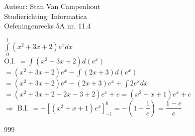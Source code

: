 \documentclass[a4paper]{article}
\begin{document}
  
\noindent \large Auteur: Stan Van Campenhout \\
\noindent \large Studierichting:  Informatica\\
\noindent \large Oefeningenreeks 5A nr. 11.4\\

\medskip

\normalsize

$ \displaystyle\int\limits_0^1\left(x^2+3x+2\right)e^x dx $\\

O.I. $ = \displaystyle\int\left(x^2+3x+2\right) d\left(e^x\right) $\\

$ = \left(x^2+3x+2\right)e^x - \displaystyle\int\left(2x+3\right)d\left(e^x\right) $\\

$ = \left(x^2+3x+2\right)e^x - \left(2x+3\right)e^x + \displaystyle\int 2e^xdx $\\

$ = \left(x^2+3x+2-2x-3+2\right)e^x + c = \left(x^2+x+1\right)e^x + c $\\

$ \Rightarrow $ B.I. $ = -\left[\left(x^2+x+1\right)e^x\right]_{-1}^0 =-\left(1-\dfrac{1}{e}\right) = \dfrac{1-e}{e} $\\

\begin{thebibliography}{999}
\end{thebibliography}
\end{document}
